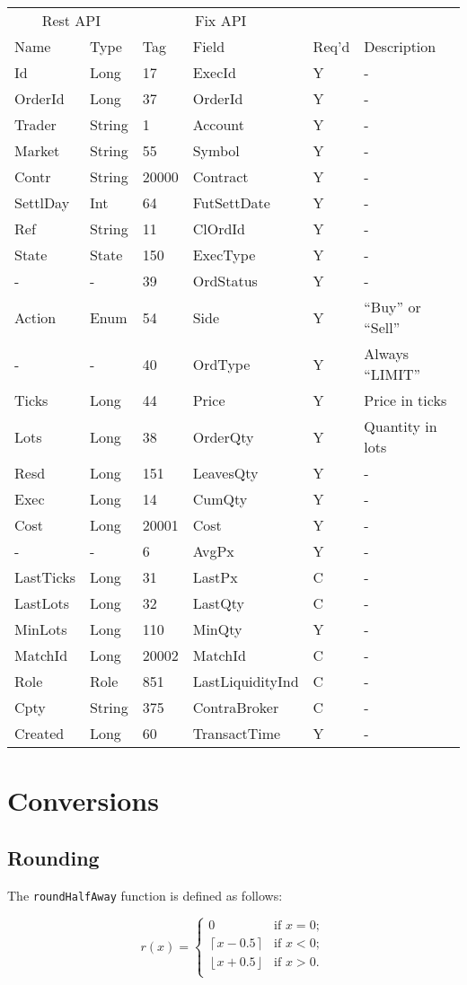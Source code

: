 \documentclass[12pt,a4paper,notitlepage,bibliography=totoc]{scrreprt}
\newcommand{\ceil}[1]{\left\lceil #1 \right\rceil}
\newcommand{\floor}[1]{\left\lfloor #1 \right\rfloor}
\begin{document}
\begin{appendices}
\vspace{5mm}
\begin{tabular}{ll|ll|ll}
\multicolumn{2}{c}{Rest API}&\multicolumn{2}{c}{Fix API}\\
Name&Type&Tag&Field&Req'd&Description\\
\hline
Id&Long&17&ExecId&Y&-\\
OrderId&Long&37&OrderId&Y&-\\
Trader&String&1&Account&Y&-\\
Market&String&55&Symbol&Y&-\\
Contr&String&20000&Contract&Y&-\\
SettlDay&Int&64&FutSettDate&Y&-\\
Ref&String&11&ClOrdId&Y&-\\
State&State&150&ExecType&Y&-\\
-&-&39&OrdStatus&Y&-\\
Action&Enum&54&Side&Y&``Buy'' or ``Sell''\\
-&-&40&OrdType&Y&Always ``LIMIT''\\
Ticks&Long&44&Price&Y&Price in ticks\\
Lots&Long&38&OrderQty&Y&Quantity in lots\\
Resd&Long&151&LeavesQty&Y&-\\
Exec&Long&14&CumQty&Y&-\\
Cost&Long&20001&Cost&Y&-\\
-&-&6&AvgPx&Y&-\\
LastTicks&Long&31&LastPx&C&-\\
LastLots&Long&32&LastQty&C&-\\
MinLots&Long&110&MinQty&Y&-\\
MatchId&Long&20002&MatchId&C&-\\
Role&Role&851&LastLiquidityInd&C&-\\
Cpty&String&375&ContraBroker&C&-\\
Created&Long&60&TransactTime&Y&-\\
\end{tabular}
\vspace{5mm}

\chapter{Conversions}

\section{Rounding}

The \texttt{roundHalfAway} function is defined as follows:

\[r(x) = \left\{\begin{array}{ll}
  0 & \mbox{if $x = 0$};\\
  \ceil{x-0.5} & \mbox{if $x < 0$};\\
  \floor{x+0.5} & \mbox{if $x > 0$}.\\
\end{array}\right.
\]

\end{appendices}

\newpage


\printglossaries
\end{document}
